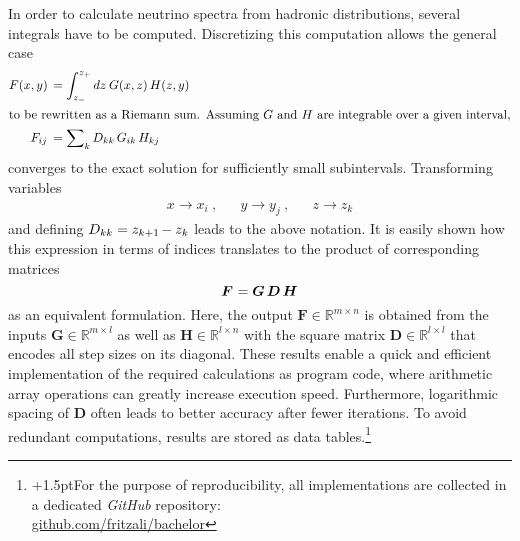 In order to calculate neutrino spectra from hadronic distributions, several integrals have to be computed. Discretizing
this computation allows the general case
\begin{align*}
	F(x, y) \kern+1.5pt &= \int_{z_{-}}^{z_{+}} dz \: G(x, z) \, H(z, y) \\
	\intertext{to be rewritten as a Riemann sum. Assuming $G$ and $H$ are integrable over a given interval,}
	F_{ij} \kern+1.8pt &= \sum\nolimits_k D_{kk} \, G_{ik} \, H_{kj}
\end{align*}
converges to the exact solution for sufficiently small subintervals. Transforming variables
\begin{align*}
	&&&& x \rightarrow x_i \: , && y \rightarrow y_j \: , && z \rightarrow z_k &&&&
\end{align*}
and defining $D_{kk} = z_{k+1} \kern-1.0pt - z_k$ leads to the above notation. It is easily shown how this expression in terms of
indices translates to the product of corresponding matrices
\begin{equation*}
	\bm{F} \kern+0.6pt = \bm{G} \, \bm{D} \, \bm{H}
\end{equation*}
as an equivalent formulation. Here, the output $\bm{F} \in \mathbb{R}^{m \times n}$ is obtained from the inputs
$\bm{G} \in \mathbb{R}^{m \times l}$ as well as $\bm{H} \in \mathbb{R}^{l \times n}$ with the square matrix
$\bm{D} \in \mathbb{R}^{l \times l}$ that encodes all step sizes on its diagonal. These results enable a quick and
efficient implementation of the required calculations as program code, where arithmetic array operations can greatly
increase execution speed. Furthermore, logarithmic spacing of $\bm{D}$ often leads to better accuracy after fewer
iterations. To avoid redundant computations, results are stored as data tables.\footnote{
{\kern+1.5pt}For the purpose of reproducibility, all implementations are collected in a dedicated \emph{GitHub} repository:\\
\href{https://github.com/fritzali/bachelor}{github.com/fritzali/bachelor}}



